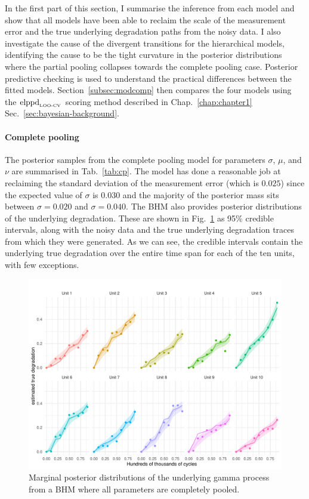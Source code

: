 In the first part of this section, I summarise the inference from each model and show that all models have been able to reclaim the scale of the measurement error and the true underlying degradation paths from the noisy data. I also investigate the cause of the divergent transitions for the hierarchical models, identifying the cause to be the tight curvature in the posterior distributions where the partial pooling collapses towards the complete pooling case. Posterior predictive checking is used to understand the practical differences between the fitted models. Section~\ref{subsec:modcomp} then compares the four models using the $\hbox{elppd}_{\text{\tiny{LOO-CV}}}$ scoring method described in Chap.~\ref{chap:chapter1} Sec.~\ref{sec:bayesian-background}.



\paragraph{Complete pooling} The posterior samples from the complete pooling model for parameters $\sigma$, $\mu$, and $\nu$ are summarised in Tab.~\ref{tab:cp}. The model has done a reasonable job at reclaiming the standard deviation of the measurement error (which is $0.025$) since the expected value of $\sigma$ is $0.030$ and the majority of the posterior mass sits between $\sigma = 0.020$ and $\sigma = 0.040$. The BHM also provides posterior distributions of the underlying degradation. These are shown in Fig.~\ref{fig:cp_filtered} as 95\% credible intervals, along with the noisy data and the true underlying degradation traces from which they were generated. As we can see, the credible intervals contain the underlying true degradation over the entire time span for each of the ten units, with few exceptions.



\begin{figure}
   \centering
   \includegraphics[width=0.8\columnwidth]{./figures/ch-5/plot-cp-filtered.pdf}
   \caption{Marginal posterior distributions of the underlying gamma process from a BHM where all parameters are completely pooled.}
   \label{fig:cp_filtered}
\end{figure}

